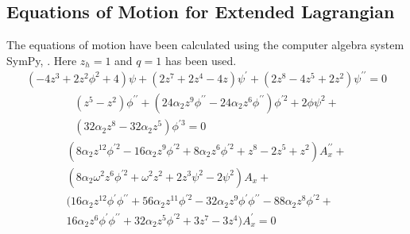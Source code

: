 \documentclass[12pt]{report}
\newcommand{\sympy}{SymPy}
\begin{document}
\begin{appendices}
\chapter{Equations of Motion for Extended Lagrangian\label{a:eqm}}
The equations of motion have been calculated using the computer algebra system \sympy, \cite{sympy}. Here $z_h=1$ and $q=1$ has been used.
\begin{equation}
 \begin{split}
\left(- 4 z^{3} + 2 z^{2} \phi^2 + 4\right) \psi + \left(2 z^{7} + 2 z^{4} - 4 z\right) \psi^\prime + \left(2 z^{8} - 4 z^{5} + 2 z^{2}\right) \psi^{\prime\prime}=0
 \end{split}
\end{equation}
\vspace{1cm}
\begin{equation}
 \begin{split}
\left(z^{5} - z^{2}\right) \phi^{\prime\prime} + \left(24 \alpha_{2} z^{9} \phi^{\prime\prime} - 24 \alpha_{2} z^{6} \phi^{\prime\prime}\right) \phi^{\prime 2} + 2 \phi \psi^2+\\\left(32 \alpha_{2} z^{8} - 32 \alpha_{2} z^{5}\right) \phi^{\prime 3}=0
 \end{split}
\end{equation}
\vspace{1cm}
\begin{equation}
 \begin{split}
\left(8 \alpha_{2} z^{12} \phi^{\prime 2} - 16 \alpha_{2} z^{9} \phi^{\prime 2} + 8 \alpha_{2} z^{6} \phi^{\prime 2} + z^{8} - 2 z^{5} + z^{2}\right) A_x^{\prime\prime}+\\\left(8 \alpha_{2} \omega^{2} z^{6} \phi^{\prime 2} + \omega^{2} z^{2} + 2 z^{3} \psi^2 - 2 \psi^2\right) A_x+\\
\big(16 \alpha_{2} z^{12} \phi^\prime \phi^{\prime\prime} + 56 \alpha_{2} z^{11} \phi^{\prime 2} - 32 \alpha_{2} z^{9} \phi^\prime \phi^{\prime\prime} - 88 \alpha_{2} z^{8} \phi^{\prime 2} + \\
16 \alpha_{2} z^{6} \phi^\prime \phi^{\prime\prime} + 32 \alpha_{2} z^{5} \phi^{\prime 2} + 3 z^{7} - 3 z^{4}\big) A_x^\prime=0\\
 \end{split}
\end{equation}

\end{appendices}


\end{document}
